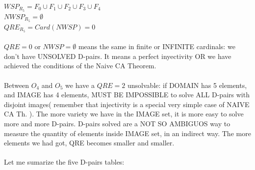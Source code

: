 		\noindent
		$WSP_{R_{5}} = F_{0} \cup F_{1} \cup  F_{2} \cup F_{3} \cup F_{4}$\\
		$NWSP_{R_{5}} = \emptyset$\\
		$QRE_{R_{5}} = Card(NWSP) = 0 $
		\\\\
		
		\noindent
		$QRE=0$ or $NWSP=\emptyset$ means the same in finite or INFINITE cardinals: we don't have UNSOLVED D-pairs. It means a perfect inyectivity OR we have achieved the conditions of the Naive CA Theorem.
		\\\\
		
		\noindent
		Between $O_{4}$ and $O_{5}$ we have a $QRE=2$ unsolvable: if DOMAIN has 5 elements, and IMAGE has 4 elements, MUST BE IMPOSSIBLE to solve ALL D-pairs with disjoint images( remember that injectivity is a special very simple case of NAIVE CA Th. ). The more variety we have in the IMAGE set, it is more easy to solve more and more D-pairs. D-pairs solved are a NOT SO AMBIGUOS way to measure the quantity of elements inside IMAGE set, in an indirect way. The more elements we had got, QRE becomes smaller and smaller.
		\\\\
		
		
		\newpage
		\noindent
		Let me sumarize the five D-pairs tables:
	
